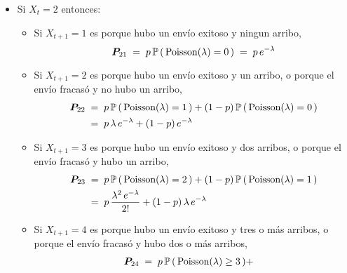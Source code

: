 \documentclass[ a4paper, twoside, 11pt]{article}
\begin{document}
\begin{problem}
\begin{itemize}
\begin{itemize}
\begin{align*}
(1-p) \, \Pr \, ( \, \Poisson(\lambda) = 2 \, ) \\
& = \; p \, \frac{\lambda^3 \, e^{-\lambda}}{3!} 
+ (1-p) \, \frac{\lambda^2 \, e^{-\lambda}}{2!} 
\end{align*}
\item Si $X_{t+1} = 4$ es porque hubo un env\'io exitoso y cuatro o m\'as arribos, o porque el env\'io fracas\'o y hubo tres o m\'as arribos, \iec 
\begin{align*}
\vec{P}_{14} \; 
& = \; p \, \Pr \, ( \, \Poisson(\lambda) \geq 4 \, ) + 
(1-p) \, \Pr \, ( \, \Poisson(\lambda) \geq 3 \, ) \\
& = \; 
p \, \sum_{k=4}^{\infty} \frac{\lambda^k \, e^{-\lambda}}{k!} 
+ (1-p) \, \sum_{k=3}^{\infty} \frac{\lambda^k \, e^{-\lambda}}{k!} 
\end{align*}
\end{itemize}
\item Si $X_t = 2$ entonces: 
\begin{itemize}
\item Si $X_{t+1} = 1$ es porque hubo un env\'io exitoso y ningun arribo, \iec 
\[
{\boldsymbol{P}}_{21} \; = \;
p \, \mathbb{P} \, ( \, \text{Poisson}(\lambda) = 0 \, ) \; = \; 
p \, e^{-\lambda}
\]
\item Si $X_{t+1} = 2$ es porque hubo un env\'io exitoso y un arribo, o porque el env\'io fracas\'o y no hubo un arribo, \iec 
\begin{align*}
{\boldsymbol{P}}_{22} \; 
& = \; p \, \mathbb{P} \, ( \, \text{Poisson}(\lambda) = 1 \, ) + 
(1-p) \, \mathbb{P} \, ( \, \text{Poisson}(\lambda) = 0 \, ) \\
& = \; p \, \lambda \, e^{-\lambda} + (1-p) \, e^{-\lambda}
\end{align*}
\item Si $X_{t+1} = 3$ es porque hubo un env\'io exitoso y dos arribos, o porque el env\'io fracas\'o y hubo un arribo, \iec 
\begin{align*}
{\boldsymbol{P}}_{23} \; 
& = \; p \, \mathbb{P} \, ( \, \text{Poisson}(\lambda) = 2 \, ) + 
(1-p) \, \mathbb{P} \, ( \, \text{Poisson}(\lambda) = 1 \, ) \\
& = \; p \, \frac{\lambda^2 \, e^{-\lambda}}{2!} 
+ (1-p) \, \lambda \, e^{-\lambda}
\end{align*}
\item Si $X_{t+1} = 4$ es porque hubo un env\'io exitoso y tres o m\'as arribos, o porque el env\'io fracas\'o y hubo dos o m\'as arribos, \iec 
\begin{align*}
\vec{P}_{24} \; 
& = \; p \, \Pr \, ( \, \Poisson(\lambda) \geq 3 \, ) + 

\end{align*}
\end{itemize}
\end{itemize}
\end{problem}
\end{document}
